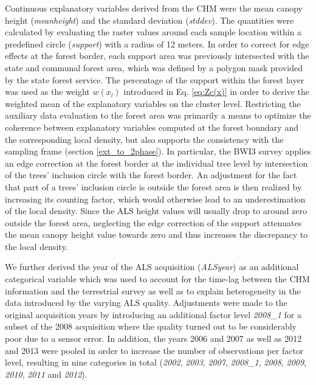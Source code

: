 Continuous explanatory variables derived from the CHM were the mean canopy height (\textit{meanheight}) and the standard deviation (\textit{stddev}). The quantities were calculated by evaluating the raster values around each sample location within a predefined circle (\textit{support}) with a radius of 12 meters. In order to correct for edge effects at the forest border, each support area was previously intersected with the state and communal forest area, which was defined by a polygon mask provided by the state forest service. The percentage of the support within the forest layer was used as the weight $w(x_l)$ introduced in Eq. \ref{eq:Zc(x)} in order to derive the weighted mean of the explanatory variables on the cluster level. Restricting the auxiliary data evaluation to the forest area was primarily a means to optimize the coherence between explanatory variables computed at the forest boundary and the corresponding local density, but also supports the consistency with the sampling frame (section \ref{ext_to_2phase}). In particular, the BWI3 survey applies an edge correction at the forest border at the individual tree level by intersection of the trees' inclusion circle with the forest border. An adjustment for the fact that part of a trees' inclusion circle is outside the forest area is then realized by increasing its counting factor, which would otherwise lead to an underestimation of the local density. Since the ALS height values will usually drop to around zero outside the forest area, neglecting the edge correction of the support attenuates the mean canopy height value towards zero and thus increases the discrepancy to the local density.\par
We further derived the year of the ALS acquisition (\textit{ALSyear}) as an additional categorical variable which was used to account for the time-lag between the CHM information and the terrestrial survey as well as to explain heterogeneity in the data introduced by the varying ALS quality. Adjustments were made to the original acquisition years by introducing an additional factor level \textit{2008\_1} for a subset of the 2008 acquisition where the quality turned out to be considerably poor due to a sensor error. In addition, the years 2006 and 2007 as well as 2012 and 2013 were pooled in order to increase the number of observations per factor level, resulting in nine categories in total (\textit{2002}, \textit{2003}, \textit{2007}, \textit{2008\_1}, \textit{2008}, \textit{2009}, \textit{2010}, \textit{2011} and \textit{2012}).


